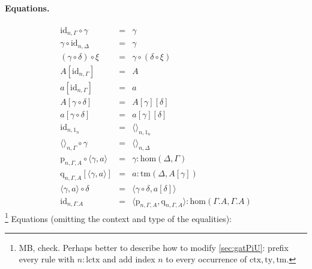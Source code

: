 \documentclass[11pt,a4paper]{article}
\theoremstyle{plain}
\theoremstyle{definition}
\newcommand{\id}{\mathsf{id}}
\def\Hom{\mathrm{hom}}
\def\id{\mathrm{id}}
\def\lctx{\mathrm{lctx}}
\newcommand{\ctx}{\mathrm{ctx}}
\newcommand{\ty}{\mathrm{ty}}
\newcommand{\tm}{\mathrm{tm}}
\newcommand{\tuple}[1]{\langle #1 \rangle}
\newcommand{\cext}{.}
\def\p{\mathrm{p}}
\def\q{\mathrm{q}}
\begin{document}
\paragraph{Equations.}
\begin{eqnarray*}
\id_{n,\Gamma} \circ \gamma &=& \gamma \\
 \gamma \circ \id_{n,\Delta} &=& \gamma \\
(\gamma \circ \delta) \circ \xi &=& \gamma \circ (\delta \circ \xi)\\
A[\id_{n,\Gamma}] &=& A 
\\
a[\id_{n,\Gamma}] &=& a%
\\
A[\gamma\circ\delta] &=& A[\gamma][\delta]
\\
a[\gamma\circ\delta] &=& a[\gamma][\delta]
\\
\id_{n,1_n} &=& \tuple{}_{n,1_n} 
\\
\tuple{}_{n,\Gamma}\circ\gamma &=& \tuple{}_{n,\Delta}%
\\
\p_{n,\Gamma,A}\circ\tuple{\gamma,a} &=& \gamma : \Hom(\Delta,\Gamma)\\
\q_{n,\Gamma,A}[\tuple{\gamma,a}] &=& a : \tm(\Delta,A[\gamma]) \\
\tuple{\gamma,a} \circ \delta &=& \tuple{\gamma\circ\delta,a[\delta]} \\
\id_{n,\Gamma\cext A} &=& \tuple{\p_{n,\Gamma,A},\q_{n,\Gamma,A}} : \Hom(\Gamma\cext A,\Gamma\cext A)
\end{eqnarray*}
\footnote{MB, check. Perhaps better to describe how to modify \ref{sec:gatPiU}:
prefix every rule with $n:\lctx$ and add index $n$ to every occurrence
of $\ctx,\ty,\tm$.}
Equations (omitting the context and type of the equalities):
\end{document}
